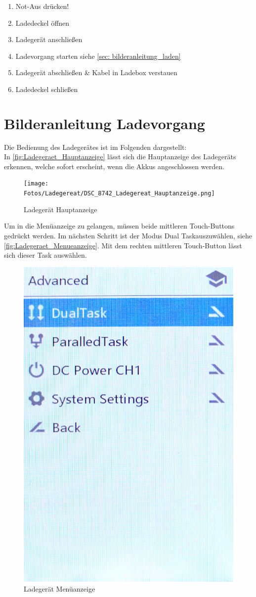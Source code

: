 \begin{enumerate}
    \item Not-Aus drücken!
    \item Ladedeckel öffnen
    \item Ladegerät anschließen
    \item Ladevorgang starten siehe \ref{sec: bilderanleitung_laden}
    \item Ladegerät abschließen \& Kabel in Ladebox verstauen
    \item Ladedeckel schließen
\end{enumerate}
\newpage
\section{Bilderanleitung Ladevorgang \label{sec: bilderanleitung_laden}}
Die Bedienung des Ladegerätes ist im Folgenden dargestellt: \\

In \autoref{fig:Ladegeraet_Hauptanzeige} lässt sich die Hauptanzeige des Ladegeräts erkennen, welche 
sofort erscheint, wenn die Akkus angeschlossen werden. 

\begin{figure}[H]
    \centering
    \texttt{[image: Fotos/Ladegereat/DSC\_8742\_Ladegereat\_Hauptanzeige.png]}
    \caption{Ladegerät Hauptanzeige \label{fig:Ladegeraet_Hauptanzeige}}
\end{figure}

Um in die Menüanzeige zu gelangen, müssen beide mittleren Touch-Buttons gedrückt werden.
Im nächsten Schritt ist der Modus \glqq Dual Task\grqq auszuwählen, siehe \autoref{fig:Ladegeraet_Menueanzeige}. Mit dem rechten mittleren Touch-Button lässt sich 
dieser Task auswählen. 
\begin{figure}[H]
    \centering
    \includegraphics[width=.3\textwidth]{Fotos/Ladegereat/DSC_8744_Lademenue.png}
    \caption{Ladegerät Menüanzeige \label{fig:Ladegeraet_Menueanzeige}}
\end{figure}

